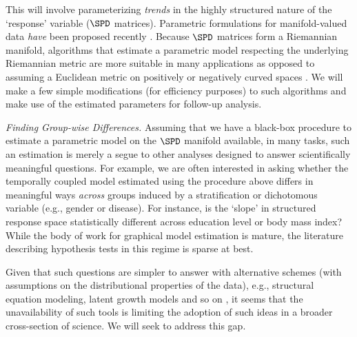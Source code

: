 This will involve parameterizing {\em trends} in the highly structured nature of the `response' variable ($\SPD$ matrices). 
Parametric formulations for manifold-valued data {\em have} been proposed recently \citep{hjkimcvpr2014,cornea2016regression}. %
Because $\SPD$ matrices form a Riemannian manifold, algorithms
that estimate a parametric model respecting the underlying Riemannian metric are more suitable in many applications as opposed to assuming a Euclidean metric 
on positively or negatively curved spaces \citep{xie2010statistical, fletcher2007riemannian, jayasumanakernel}. We will make a few simple modifications 
(for efficiency purposes) to such algorithms and make use of the estimated parameters for follow-up analysis. 


{\em Finding Group-wise Differences.} Assuming that we have a black-box procedure to estimate a parametric model on the $\SPD$ manifold available, 
in many tasks, such an estimation is merely a segue to other analyses designed to answer scientifically meaningful questions. 
For example, we are often interested in asking whether the temporally coupled model estimated using the procedure above differs 
in meaningful ways {\em across} groups induced by a stratification or dichotomous variable (e.g., gender or disease). For instance, is the `slope' in structured response space statistically different 
across education level or body mass index? 
While the body of work for graphical model estimation is mature, the literature describing hypothesis tests in this
regime \citep{diffnet,belilovsky2015hypothesis}
is sparse at best.

Given that such questions are simpler to answer with alternative schemes (with assumptions on the distributional properties of the data), e.g., structural equation modeling, 
latent growth models and so on \citep{ullman2003structural, mcardle2000introduction}, it seems that 
the unavailability of such tools is limiting the adoption of such ideas in a broader 
cross-section of science. We will seek to address this gap. 

